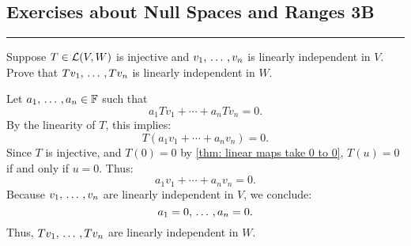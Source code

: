\subsection*{Exercises about Null Spaces and Ranges 3B}
\hrule
\phantom{.}

\setcounter{xrcscount}{8}
%

\setcounter{xrcscount}{7}
\begin{xrcs} %
  Suppose $T \in \mathcal{L}(V,W)$ is injective and $v_1, {\, \ldots \,\,}, v_n$ is linearly independent in $V$. Prove that $Tv_1, {\, \ldots \,\,}, Tv_n$ is linearly independent in $W$.

  \begin{prf}
    Let $a_1, {\, \ldots \,\,}, a_n \in \mathbb{F}$ such that
    \[
    a_1 Tv_1 + \cdots + a_n Tv_n = 0.
    \]
    By the linearity of $T$, this implies:
    \[
    T(a_1 v_1 + \cdots + a_n v_n) = 0.
    \]
    Since $T$ is injective, and $T(0)=0$ by \ref{thm: linear maps take 0 to 0}, \( T(u) = 0 \) if and only if \( u = 0 \). Thus:
    \[
    a_1 v_1 + \cdots + a_n v_n = 0.
    \]
    Because $v_1, {\, \ldots \,\,}, v_n$ are linearly independent in $V$, we conclude:
    \[
    a_1 = 0, {\, \ldots \,\,}, a_n = 0.
    \]
    Thus, $Tv_1, {\, \ldots \,\,}, Tv_n$ are linearly independent in $W$.
  \end{prf}
\end{xrcs}

